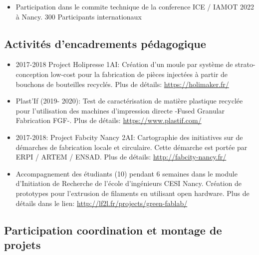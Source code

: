 \documentclass[
  11pt,
]{article}
\providecommand{\tightlist}{%
  \setlength{\itemsep}{0pt}\setlength{\parskip}{0pt}}\usepackage{longtable,booktabs,array}
\begin{document}
\begin{itemize}
\tightlist
\item
  Participation dans le commite technique de la conference ICE / IAMOT
  2022 à Nancy. 300 Participants internationaux
\end{itemize}

\hypertarget{activituxe9s-dencadrements-puxe9dagogique}{%
\subsection{Activités d'encadrements
pédagogique}\label{activituxe9s-dencadrements-puxe9dagogique}}

\begin{itemize}
\item
  2017-2018 Project Holipresse 1AI: Création d'un moule par système de
  strato-conception low-cost pour la fabrication de pièces injectées à
  partir de bouchons de bouteilles recyclés. Plus de détails:
  \url{https://holimaker.fr/}
\item
  Plast'If (2019- 2020): Test de caractérisation de matière plastique
  recyclée pour l'utilisation des machines d'impression directe -Fused
  Granular Fabrication FGF-. Plus de détails:
  \url{https://www.plastif.com/}
\item
  2017-2018: Project Fabcity Nancy 2AI: Cartographie des initiatives sur
  de démarches de fabrication locale et circulaire. Cette démarche est
  portée par ERPI / ARTEM / ENSAD. Plus de détails:
  \url{http://fabcity-nancy.fr/}
\item
  Accompagnement des étudiants (10) pendant 6 semaines dans le module
  d'Initiation de Recherche de l'école d'ingénieurs CESI Nancy. Création
  de prototypes pour l'extrusion de filaments en utilisant open
  hardware. Plus de détails dans le lien:
  \url{http://lf2l.fr/projects/green-fablab/}
\end{itemize}

\hypertarget{participation-coordination-et-montage-de-projets}{%
\subsection{Participation coordination et montage de
projets}\label{participation-coordination-et-montage-de-projets}}
\end{document}
